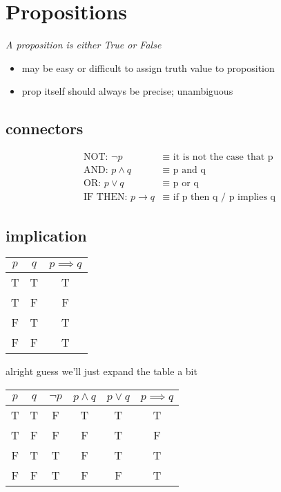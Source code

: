 \documentclass{article}
\begin{document}
\section*{Propositions}

\textit{A proposition is either True or False}

\begin{itemize}
\item may be easy or difficult to assign truth value to proposition
\item prop itself should always be precise; unambiguous
\end{itemize}

\subsection*{connectors}

\begin{align}
\text{NOT: }  \neg p &\equiv \text{ it is not the case that p} \\
\text{AND: } p \wedge q &\equiv \text{ p and q} \\
\text{OR: } p \vee q &\equiv \text{ p or q} \\
\text{IF THEN: } p \rightarrow q &\equiv \text{ if p then q / p implies q}
\end{align}

\begin{center}
\subsection*{implication}
\begin{tabular}{c c | c}
$p$ & $q$ & $p \implies q$ \\ [0.5ex]
\hline 
T & T & T \\ 
T & F & F \\
F & T & T \\
F & F & T
\end{tabular}
\end{center}

alright guess we'll just expand the table a bit

\begin{center}
\begin{tabular}{c c | c c c c}
$p$ & $q$ & $\neg p$ & $p \wedge q$ & $p \vee q$ & $p \implies q$ \\ [0.5ex]
\hline 
T & T & F & T & T & T \\ 
T & F & F & F & T & F \\
F & T & T & F & T & T \\
F & F & T & F & F & T
\end{tabular}
\end{center}
\end{document}
